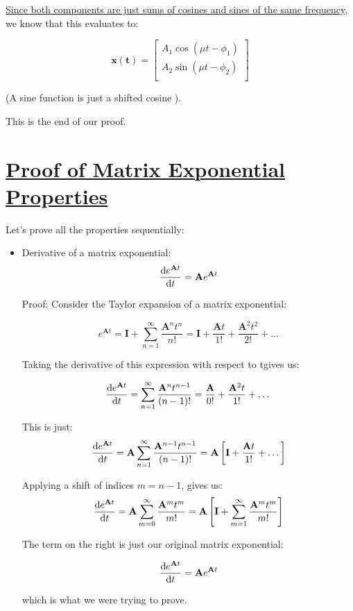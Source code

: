 \documentclass{report}
\begin{document}
{\hyperref[th:sinPlusCosin]{Since both components are just sums of cosines and sines of the same frequency}, we know that this evaluates to:

$$
\mathbf{x(t)} = 
\begin{bmatrix}
    A_1\cos(\mu t - \phi_1) \\ 
    A_2\sin(\mu t - \phi_2) \\
\end{bmatrix}
$$

(A sine function is just a shifted cosine ).

This is the end of our proof.

\section{\hyperref[sec:matExpProp]{Proof of Matrix Exponential Properties}}
\label{sec:prMatExpProp}
Let's prove all the properties sequentially:
\begin{itemize}
    \item Derivative of a matrix exponential:
    $$\dv{e^{\mathbf{A}t}}{t}
    = \mathbf{A}e^{\mathbf{A}t}
    $$
    
    
    Proof: Consider the Taylor expansion of a matrix exponential:
    
    
    $$e^{\mathbf{A}t} = \mathbf{I} + \sum_{n=1}^\infty \frac{{\mathbf{A}}^nt^n}{n!} = \mathbf{I} + \frac{\mathbf{A}t}{1!} + \frac{\mathbf{A}^2t^2}{2!} + \dots$$
    
    Taking the derivative of this expression with respect to tgives us:
    
    $$\dv{e^{\mathbf{A}t}}{t}
    = \sum_{n=1}^\infty \frac{{\mathbf{A}}^nt^{n-1}}{(n-1)!} = \frac{\mathbf{A}}{0!} + \frac{\mathbf{A}^2t}{1!} + \dots$$
    
    This is just:
    $$\dv{e^{\mathbf{A}t}}{t}
    = \mathbf{A}\sum_{n=1}^\infty \frac{{\mathbf{A}}^{n-1}t^{n-1}}{(n-1)!} = \mathbf{A}\left[\mathbf{I} + \frac{\mathbf{A}t}{1!} + \dots\right]$$
    
    Applying a shift of indices $m = n-1$, gives us:
    $$\dv{e^{\mathbf{A}t}}{t}
    = \mathbf{A}\sum_{m=0}^\infty \frac{{\mathbf{A}}^mt^m}{m!} = \mathbf{A}\left[\mathbf{I} + \sum_{m=1}^\infty \frac{{\mathbf{A}}^mt^m}{m!}\right]$$
    
    The term on the right is just our original matrix exponential:
    
    $$\dv{e^{\mathbf{A}t}}{t}
    =\mathbf{A}e^{\mathbf{A}t}$$
    
    which is what we were trying to prove.
    

\end{itemize}}
\end{document}
